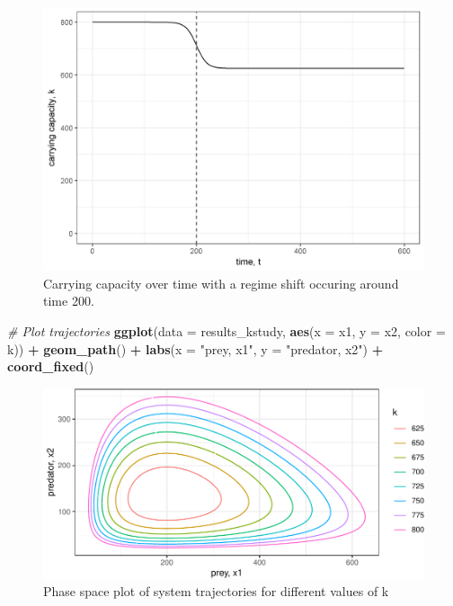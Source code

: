 \documentclass[12pt,twoside,openany]{reedthesis}
\newenvironment{Shaded}{\begin{snugshade}}{\end{snugshade}}
\newcommand{\CommentTok}[1]{\textcolor[rgb]{0.56,0.35,0.01}{\textit{#1}}}
\newcommand{\DataTypeTok}[1]{\textcolor[rgb]{0.13,0.29,0.53}{#1}}
\newcommand{\KeywordTok}[1]{\textcolor[rgb]{0.13,0.29,0.53}{\textbf{#1}}}
\newcommand{\NormalTok}[1]{#1}
\newcommand{\OperatorTok}[1]{\textcolor[rgb]{0.81,0.36,0.00}{\textbf{#1}}}
\newcommand{\StringTok}[1]{\textcolor[rgb]{0.31,0.60,0.02}{#1}}
\begin{document}
\begin{figure}
\includegraphics[width=27.08in]{./chapterFiles/fiGuide/figures/kByTime} \caption{Carrying capacity over time with a regime shift occuring around time 200.}\label{fig:kByTime}
\end{figure}
\begin{Shaded}
\begin{Highlighting}[]
\CommentTok{# Plot trajectories}
\KeywordTok{ggplot}\NormalTok{(}\DataTypeTok{data =}\NormalTok{ results_kstudy, }\KeywordTok{aes}\NormalTok{(}\DataTypeTok{x =}\NormalTok{ x1, }\DataTypeTok{y =}\NormalTok{ x2, }\DataTypeTok{color =}\NormalTok{ k)) }\OperatorTok{+}
\StringTok{  }\KeywordTok{geom_path}\NormalTok{() }\OperatorTok{+}
\StringTok{  }\KeywordTok{labs}\NormalTok{(}\DataTypeTok{x =} \StringTok{"prey, x1"}\NormalTok{, }\DataTypeTok{y =} \StringTok{"predator, x2"}\NormalTok{) }\OperatorTok{+}
\StringTok{  }\KeywordTok{coord_fixed}\NormalTok{()}
\end{Highlighting}
\end{Shaded}
\begin{figure}
\centering
\includegraphics{_myDissertation_files/figure-latex/kTrajectories-1.pdf}
\caption{\label{fig:kTrajectories}Phase space plot of system trajectories for different values of k}
\end{figure}
\end{document}
